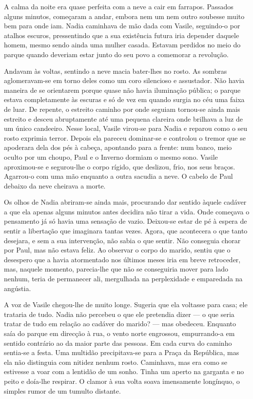A calma da noite era quase perfeita com a neve a cair em farrapos.
Passados alguns minutos, começaram a andar, embora nem um nem outro
soubesse muito bem para onde iam. Nadia caminhava de mão dada com
Vasile, seguindo-o por atalhos escuros, pressentindo que a sua
existência futura iria depender daquele homem, mesmo sendo ainda uma
mulher casada. Estavam perdidos no meio do parque quando deveriam estar
junto do seu povo a comemorar a revolução.

Andavam às voltas, sentindo a neve macia bater-lhes no rosto. As sombras
aglomeravam-se em torno deles como um coro silencioso e assustador. Não
havia maneira de se orientarem porque quase não havia iluminação
pública; o parque estava completamente às escuras e só de vez em quando
surgia no céu uma faixa de luar. De repente, o estreito caminho por onde seguiam tornou-se ainda mais estreito e desceu
abruptamente até uma pequena clareira onde brilhava a luz de um único
candeeiro. Nesse local, Vasile virou-se para Nadia e reparou como o seu
rosto exprimia terror. Depois ela pareceu dominar-se e controlou o
tremor que se apoderara dela dos pés à cabeça, apontando para a
frente: num banco, meio oculto por um choupo, Paul e o Inverno dormiam o
mesmo sono. Vasile aproximou-se e segurou-lhe o corpo rígido, que
deslizou, frio, nos seus braços. Agarrou-o com uma mão enquanto a outra
sacudia a neve. O cabelo de Paul debaixo da neve cheirava a morte.

Os olhos de Nadia abriram-se ainda mais, procurando dar sentido àquele
cadáver a que ela apenas alguns minutos antes decidira não tirar a
vida. Onde começava o pensamento já só havia uma sensação de vazio.
Deixou-se estar de pé à espera de sentir a libertação que imaginara
tantas vezes. Agora, que acontecera o que tanto desejara, e sem a sua
intervenção, não sabia o que sentir. Não conseguia chorar por Paul,
mas não estava feliz. Ao observar o corpo do marido, sentiu que o
desespero que a havia atormentado nos últimos meses iria em breve
retroceder, mas, naquele momento, parecia-lhe que não se conseguiria
mover para lado nenhum, teria de permanecer ali, mergulhada na
perplexidade e emparedada na angústia.

A voz de Vasile chegou-lhe de muito longe. Sugeria que
ela voltasse para casa; ele trataria de tudo. Nadia não percebeu o que
ele pretendia dizer --- o que seria tratar de tudo em relação ao cadáver
do marido? --- mas obedeceu. Enquanto saía do parque em direcção à rua, o
vento norte
engrossou, empurrando-a em sentido contrário ao da maior parte das
pessoas. Em cada curva do caminho sentia-se a festa. Uma multidão
precipitava-se para a Praça da República, mas ela não distinguia com
nitidez nenhum rosto. Caminhava, mas era como se estivesse a voar com a
lentidão de um sonho. Tinha um aperto na garganta e no peito e
doía-lhe respirar. O clamor à sua volta soava imensamente longínquo, o
simples rumor de um tumulto distante.

